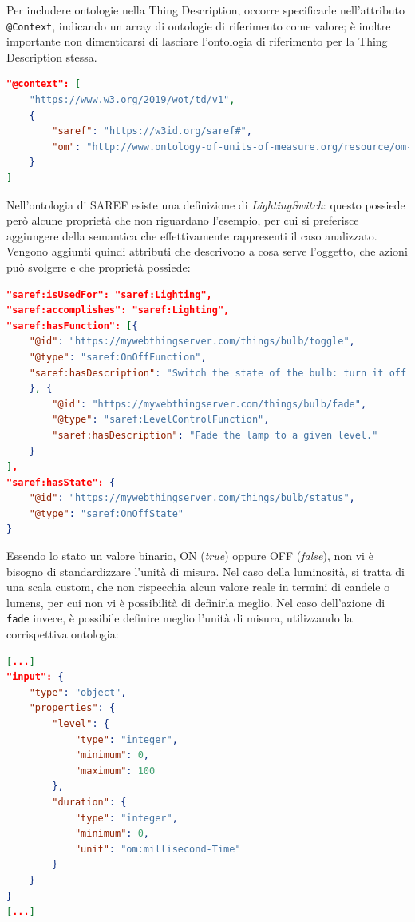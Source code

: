 \documentclass[12pt,a4paper,openright,oneside]{report}
\begin{document}
Per includere ontologie nella Thing Description, occorre specificarle nell'attributo \texttt{@Context}, indicando un array di ontologie di riferimento come valore; è inoltre importante non dimenticarsi di lasciare l'ontologia di riferimento per la Thing Description stessa.

\begin{lstlisting}[language=json,caption={Aggiunta del contesto per includere ontologie},label=lst:semantic-td1]
"@context": [
	"https://www.w3.org/2019/wot/td/v1",
	{
		"saref": "https://w3id.org/saref#",
		"om": "http://www.ontology-of-units-of-measure.org/resource/om-2/"
	}
]
\end{lstlisting}

Nell'ontologia di SAREF esiste una definizione di \textit{LightingSwitch}: questo possiede però alcune proprietà che non riguardano l'esempio, per cui si preferisce aggiungere della semantica che effettivamente rappresenti il caso analizzato. Vengono aggiunti quindi attributi che descrivono a cosa serve l'oggetto, che azioni può svolgere e che proprietà possiede:

\begin{lstlisting}[language=json,caption={Aggiunta di semantica per la lampadina},label=lst:semantic-td2]
"saref:isUsedFor": "saref:Lighting",
"saref:accomplishes": "saref:Lighting",
"saref:hasFunction": [{	
	"@id": "https://mywebthingserver.com/things/bulb/toggle",
	"@type": "saref:OnOffFunction",
	"saref:hasDescription": "Switch the state of the bulb: turn it off if on or turn it on when off."
	}, {
		"@id": "https://mywebthingserver.com/things/bulb/fade",
		"@type": "saref:LevelControlFunction",
		"saref:hasDescription": "Fade the lamp to a given level."
	}
],
"saref:hasState": {
	"@id": "https://mywebthingserver.com/things/bulb/status",
	"@type": "saref:OnOffState"
}
\end{lstlisting}

Essendo lo stato un valore binario, ON (\textit{true}) oppure OFF (\textit{false}), non vi è bisogno di standardizzare l'unità di misura. Nel caso della luminosità, si tratta di una scala custom, che non rispecchia alcun valore reale in termini di candele o lumens, per cui non vi è possibilità di definirla meglio. Nel caso dell'azione di \texttt{fade} invece, è possibile definire meglio l'unità di misura, utilizzando la corrispettiva ontologia:

\begin{lstlisting}[language=json,caption={Unità di misure standardizzate},label=lst:semantic-td3]
[...]
"input": {
	"type": "object",
	"properties": {
		"level": {
			"type": "integer",
			"minimum": 0,
			"maximum": 100
		},
		"duration": {
			"type": "integer",
			"minimum": 0,
			"unit": "om:millisecond-Time"
		}
	}
}
[...]
\end{lstlisting}
\end{document}
